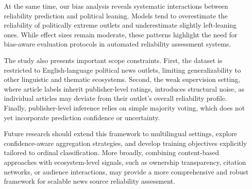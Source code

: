 \documentclass[journal]{IEEEtran}
\begin{document}

At the same time, our bias analysis reveals systematic interactions between reliability prediction and political leaning. Models tend to overestimate the reliability of politically extreme outlets and underestimate slightly left-leaning ones. While effect sizes remain moderate, these patterns highlight the need for bias-aware evaluation protocols in automated reliability assessment systems.

The study also presents important scope constraints. First, the dataset is restricted to English-language political news outlets, limiting generalizability to other linguistic and thematic ecosystems. Second, the weak supervision setting, where article labels inherit publisher-level ratings, introduces structural noise, as individual articles may deviate from their outlet's overall reliability profile. Finally, publisher-level inference relies on simple majority voting, which does not yet incorporate prediction confidence or uncertainty. %

Future research should extend this framework to multilingual settings, explore confidence-aware aggregation strategies, and develop training objectives explicitly tailored to ordinal classification. More broadly, combining content-based approaches with ecosystem-level signals, such as ownership transparency, citation networks, or audience interactions, may provide a more comprehensive and robust framework for scalable news source reliability assessment.








\end{document}
